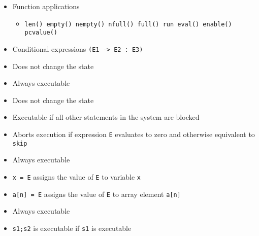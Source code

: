 \begin{itemize}
\begin{itemize}
\begin{itemize}
                \end{itemize}
            \item Function applications
                \begin{itemize}
                    \item \verb+len() empty() nempty() nfull() full() run eval() enable() pcvalue()+
                \end{itemize}
            \item Conditional expressions \verb+(E1 -> E2 : E3)+
        \end{itemize}
        \begin{itemize}
                \begin{itemize}
                    \item Does not change the state
                    \item Always executable
                \end{itemize}
                \begin{itemize}
                    \item Does not change the state
                    \item Executable if all other statements in the system are blocked
                \end{itemize}
                \begin{itemize}
                    \item Aborts execution if expression \verb+E+ evaluates to zero and otherwise equivalent to \verb+skip+
                    \item Always executable
                \end{itemize}
                \begin{itemize}
                    \item \verb+x = E+ assigns the value of \verb+E+ to variable \verb+x+
                    \item \verb+a[n] = E+ assigns the value of \verb+E+ to array element \verb+a[n]+
                    \item Always executable
                \end{itemize}
                \begin{itemize}
                    \item \verb+s1;s2+ is executable if \verb+s1+ is executable
                \end{itemize}

\end{itemize}
\end{itemize}
